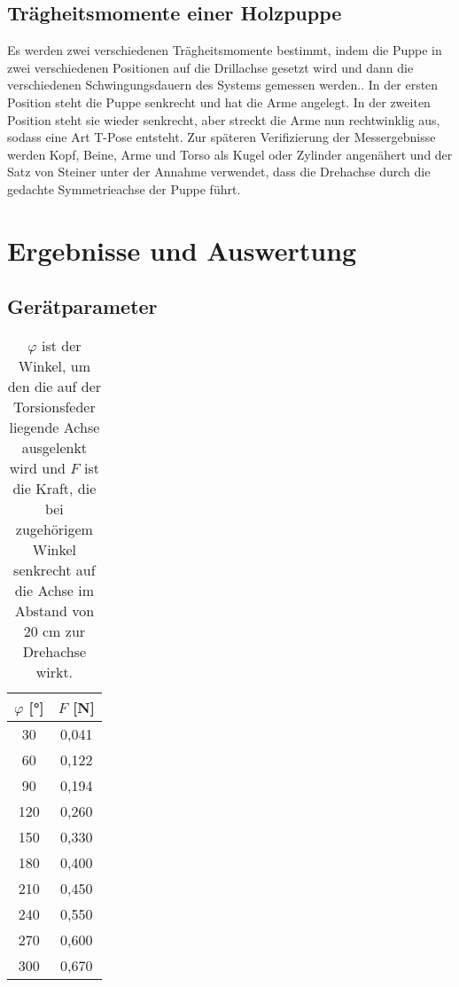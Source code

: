 \documentclass[titlepage = firstcover]{scrartcl}
\begin{document}
      \subsection{Trägheitsmomente einer Holzpuppe}
      Es werden zwei verschiedenen Trägheitsmomente bestimmt, indem die Puppe in zwei verschiedenen Positionen auf die Drillachse gesetzt wird und dann die verschiedenen
      Schwingungsdauern des Systems gemessen werden.. In der ersten Position steht die Puppe senkrecht und hat die Arme angelegt. In der zweiten Position steht sie wieder 
      senkrecht, aber streckt die Arme nun rechtwinklig aus, sodass eine Art T-Pose entsteht. Zur späteren Verifizierung der Messergebnisse werden Kopf, Beine, Arme
      und Torso als Kugel oder Zylinder angenähert und der Satz von Steiner unter der Annahme verwendet, dass die Drehachse durch die gedachte Symmetrieachse der
      Puppe führt.

    \section{Ergebnisse und Auswertung}

      \subsection{Gerätparameter}
      \begin{table}[h]
        \centering
        \caption{$\varphi$ ist der Winkel, um den die auf der Torsionsfeder liegende Achse ausgelenkt wird und $F$ ist die Kraft, die bei zugehörigem Winkel senkrecht auf die Achse im Abstand von 20 cm zur Drehachse wirkt.}
        \label{tab:Tabelle_1}

        \begin{tabular}{c c}
          \toprule
          {$\varphi$ [°]} & {$F$ [N]} \\
          \midrule
          30 & 0,041 \\
          60 & 0,122 \\
          90 & 0,194 \\
          120 & 0,260 \\
          150 & 0,330 \\
          180 & 0,400 \\
          210 & 0,450 \\
          240 & 0,550 \\
          270 & 0,600 \\
          300 & 0,670 \\
          \bottomrule
        \end{tabular}
      \end{table}
      
\end{document}
